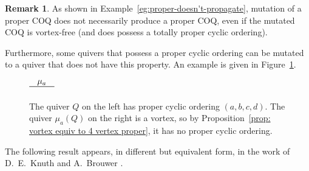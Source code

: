 \documentclass[11pt, letterpaper]{amsart}
\theoremstyle{definition}
\newtheorem{remark}[theorem]{Remark}
\numberwithin{equation}{section}
\begin{document}
\begin{remark}
\label{rem:proper-doesn't-propagate}
 As shown in Example~\ref{eg:proper-doesn't-propagate}, 
mutation of a proper COQ does not necessarily produce a proper COQ, 
even if the mutated COQ is vortex-free (and does possess a totally proper cyclic ordering). %

Furthermore, some quivers that possess a proper cyclic ordering can be mutated to a quiver that does not have this property.
An example is given in Figure~\ref{fig:vortex mutation}.
\end{remark}

\pagebreak[3]


\begin{figure}[ht]
\begin{center}
\hspace{.3in} 
$\mathrel{\raisebox{0cm}{$\stackrel{\textstyle\mu_a}{\rule[.5ex]{3em}{0.5pt}}$}}$
\hspace{.3in} 
\end{center}
\vspace{3pt}
\caption{The quiver $Q$ on the left has proper cyclic ordering $(a,b,c,d)$.
The quiver $\mu_a(Q)$ on the right is a vortex, so by Proposition~\ref{prop: vortex equiv to 4 vertex proper}, 
it has no proper cyclic ordering.}
\vspace{-10pt}
\label{fig:vortex mutation}
\end{figure}



The following result appears, in different but equivalent form, in the work of D.~E.~Knuth \cite[Section~4]{Knuth} 
and A.~Brouwer \cite[Section~1.B]{brouwer}. %
\end{document}

